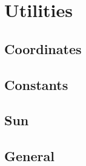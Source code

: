 \section{Utilities}
	
	\subsection{Coordinates}
	
	\subsection{Constants}
	
	\subsection{Sun}
	
	\subsection{General}